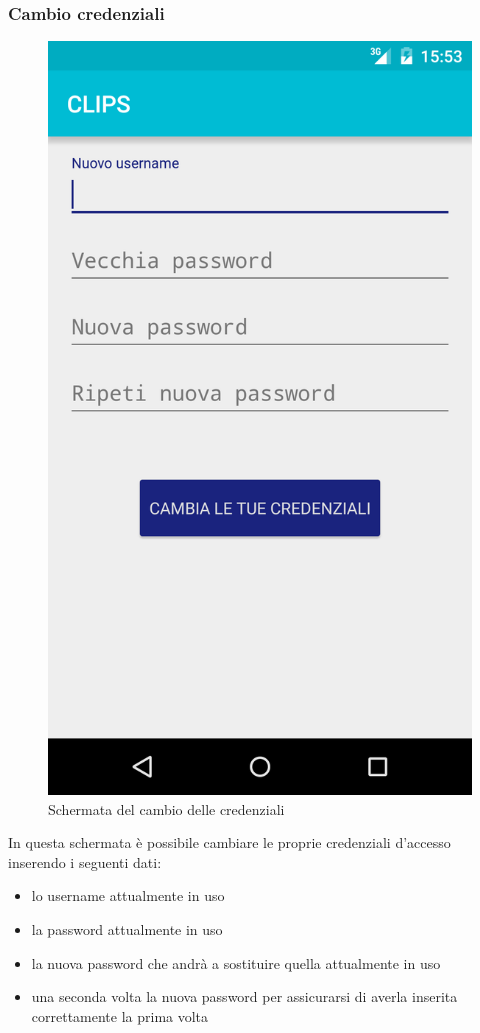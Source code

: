\subsubsection{Cambio credenziali}
\begin{figure}[!h]
	\centering
	\includegraphics[scale=0.15]{screenshot/cambio_credenziali}
	\caption{Schermata del cambio delle credenziali}
\end{figure}

In questa schermata è possibile cambiare le proprie credenziali d'accesso inserendo i seguenti dati:
\begin{itemize}
	\item lo username attualmente in uso
	\item la password attualmente in uso
	\item la nuova password che andrà a sostituire quella attualmente in uso
	\item una seconda volta la nuova password per assicurarsi di averla inserita correttamente la prima volta
\end{itemize}

